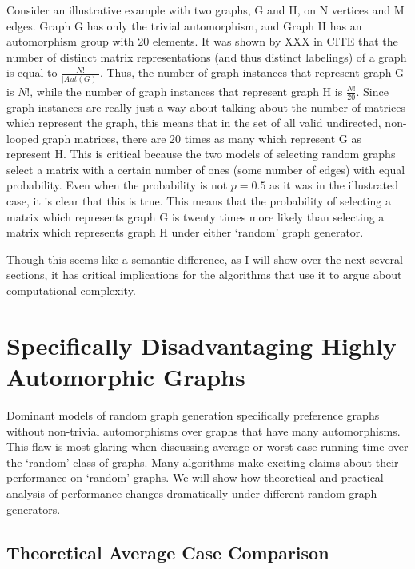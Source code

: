 \documentclass[11pt,a4paper]{report}
\begin{document}
Consider an illustrative example with two graphs, G and H, on N vertices and M edges.
Graph G has only the trivial automorphism, and Graph H has an automorphism group with 20 elements.
It was shown by XXX in CITE that the number of distinct matrix representations (and thus distinct labelings) of a graph is equal to $\frac{N!}{|Aut(G)|}$.
Thus, the number of graph instances that represent graph G is $N!$, while the number of graph instances that represent graph H is $\frac{N!}{20}$.
Since graph instances are really just a way about talking about the number of matrices which represent the graph, this means that in the set of all valid undirected, non-looped graph matrices, there are 20 times as many which represent G as represent H.
This is critical because the two models of selecting random graphs select a matrix with a certain number of ones (some number of edges) with equal probability.
Even when the probability is not $p=0.5$ as it was in the illustrated case, it is clear that this is true.
This means that the probability of selecting a matrix which represents graph G is twenty times more likely than selecting a matrix which represents graph H under either `random' graph generator.

Though this seems like a semantic difference, as I will show over the next several sections, it has critical implications for the algorithms that use it to argue about computational complexity.

\section{Specifically Disadvantaging Highly Automorphic Graphs}

Dominant models of random graph generation specifically preference graphs without non-trivial automorphisms over graphs that have many automorphisms. 
This flaw is most glaring when discussing average or worst case running time over the `random' class of graphs.
Many algorithms make exciting claims about their performance on `random' graphs.
We will show how theoretical and practical analysis of performance changes dramatically under different random graph generators.

\subsection{Theoretical Average Case Comparison}
\end{document}
